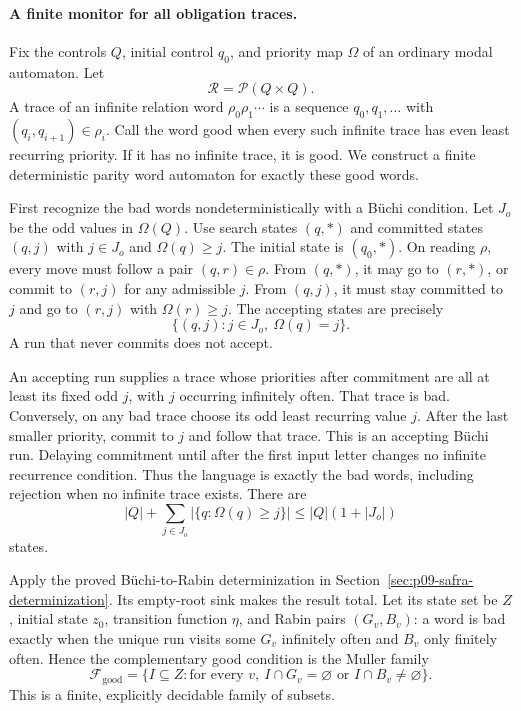 \paragraph{A finite monitor for all obligation traces.}
\label{sec:p09-mu-trace-monitor}
Fix the controls \(Q\), initial
control \(q_0\), and priority
map \(\Omega\) of an ordinary
modal automaton. Let
\[
 \mathcal R=\mathcal P(Q\times Q).
\]
A trace of an infinite relation
word \(\rho_0\rho_1\cdots\)
is a sequence \(q_0,q_1,\ldots\)
with \((q_i,q_{i+1})\in\rho_i\).
Call the word good when every
such infinite trace has even
least recurring priority.
If it has no infinite trace,
it is good.
We construct a finite deterministic
parity word automaton for exactly
these good words.

First recognize the bad words
nondeterministically with a
B\"uchi condition. Let \(J_o\)
be the odd values in \(\Omega(Q)\).
Use search states \((q,*)\)
and committed states \((q,j)\)
with \(j\in J_o\) and
\(\Omega(q)\geq j\).
The initial state is \((q_0,*)\).
On reading \(\rho\), every move
must follow a pair \((q,r)\in\rho\).
From \((q,*)\), it may go to
\((r,*)\), or commit to
\((r,j)\) for any admissible \(j\).
From \((q,j)\), it must stay
committed to \(j\) and go to
\((r,j)\) with \(\Omega(r)\geq j\).
The accepting states are precisely
\[
 \{(q,j):j\in J_o,\ \Omega(q)=j\}.
\]
A run that never commits does
not accept.

An accepting run supplies a trace
whose priorities after commitment
are all at least its fixed odd
\(j\), with \(j\) occurring
infinitely often. That trace is
bad. Conversely, on any bad
trace choose its odd least
recurring value \(j\).
After the last smaller priority,
commit to \(j\) and follow that
trace. This is an accepting
B\"uchi run. Delaying commitment
until after the first input
letter changes no infinite
recurrence condition.
Thus the language is exactly
the bad words, including rejection
when no infinite trace exists.
There are
\[
 |Q|+\sum_{j\in J_o}
             |\{q:\Omega(q)\geq j\}|
 \leq |Q|(1+|J_o|)
\]
states.

Apply the proved B\"uchi-to-Rabin
determinization in
Section~\ref{sec:p09-safra-determinization}.
Its empty-root sink makes the
result total. Let its state set
be \(Z\), initial state \(z_0\),
transition function \(\eta\), and Rabin pairs
\((G_v,B_v)\): a word is bad
exactly when the unique run
visits some \(G_v\) infinitely
often and \(B_v\) only finitely
often. Hence the complementary
good condition is the Muller family
\[
 \mathcal F_{\mathrm{good}}=
 \{I\subseteq Z:
   \text{for every }v,\ 
       I\cap G_v=\varnothing
       \text{ or }I\cap B_v\ne\varnothing\}.
\]
This is a finite, explicitly
decidable family of subsets.

